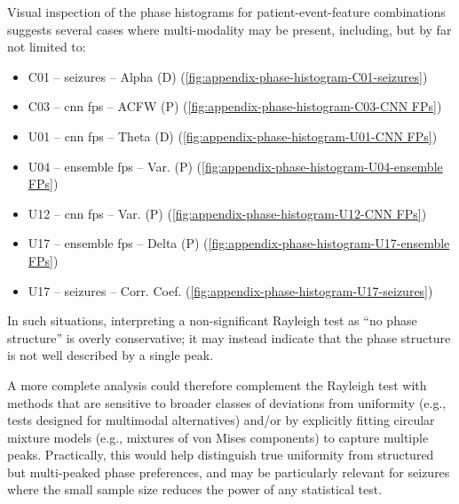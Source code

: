 Visual inspection of the phase histograms for patient-event-feature combinations suggests several cases where multi-modality may be present, including, but by far not limited to:
\begin{itemize}
    \item C01 -- seizures -- Alpha (D) (\cref{fig:appendix-phase-histogram-C01-seizures})
    \item C03 -- \gls{cnn} \glspl{fp} -- ACFW (P) (\cref{fig:appendix-phase-histogram-C03-CNN FPs})
    \item U01 -- \gls{cnn} \glspl{fp} -- Theta (D) (\cref{fig:appendix-phase-histogram-U01-CNN FPs})
    \item U04 -- ensemble \glspl{fp} -- Var. (P) (\cref{fig:appendix-phase-histogram-U04-ensemble FPs})
    \item U12 -- \gls{cnn} \glspl{fp} -- Var. (P) (\cref{fig:appendix-phase-histogram-U12-CNN FPs})
    \item U17 -- ensemble \glspl{fp} -- Delta (P) (\cref{fig:appendix-phase-histogram-U17-ensemble FPs})
    \item U17 -- seizures -- Corr. Coef. (\cref{fig:appendix-phase-histogram-U17-seizures})
\end{itemize}
In such situations, interpreting a non-significant Rayleigh test as ``no phase structure'' is overly conservative; it may instead indicate that the phase structure is not well described by a single peak.

A more complete analysis could therefore complement the Rayleigh test with methods that are sensitive to broader classes of deviations from uniformity (e.g., tests designed for multimodal alternatives) and/or by explicitly fitting circular mixture models (e.g., mixtures of von Mises components) to capture multiple peaks.
Practically, this would help distinguish true uniformity from structured but multi-peaked phase preferences, and may be particularly relevant for seizures where the small sample size reduces the power of any statistical test.
